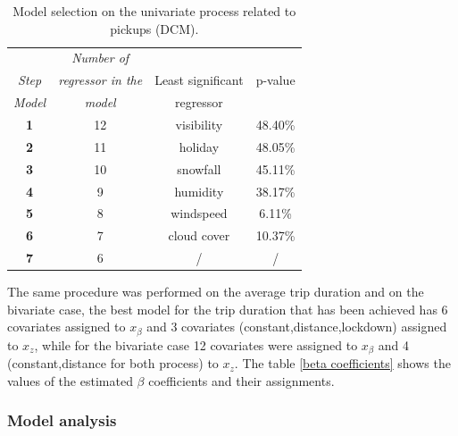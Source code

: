 \begin{table}[h!]
	\centering
	\renewcommand\arraystretch{1.3}
	\begin{tabular}{c|c|c|c}
		\hline
		\textit{} & \textit{Number of}  &  &    \\
		\textit{Step} & \textit{regressor in the}  & Least significant & p-value \\
		\textit{Model} & \textit{model}  & regressor &  \\
		\hline
		\textbf{1} & \num{12} & visibility & \num{48.40}\%  \\
		\hline
		\textbf{2} & \num{11} & holiday & \num{48.05}\%  \\
		\hline
		\textbf{3} & \num{10} & snowfall & \num{45.11}\%  \\
		\hline
		\textbf{4} & \num{9} & humidity & \num{38.17}\%  \\
		\hline
		\textbf{5} & \num{8} & windspeed & \num{6.11}\% \\
		\hline
		\textbf{6} & \num{7} & cloud cover & \num{10.37}\%  \\
		\hline
		\textbf{7} & \num{6} & /  &  / \\
		\hline
	\end{tabular}
	\caption[Model selection on the univariate process related to pickups (DCM).]{Model selection on the univariate process related to pickups (DCM).}
	\label{Model_selection_pickups}
\end{table}
\noindent


The same procedure was performed on the average trip duration and on the bivariate case, the best model for the trip duration that has been achieved has \num{6} covariates assigned to $x_{\beta}$ and \num{3} covariates (constant,distance,lockdown) assigned to $x_{z}$,
while for the bivariate case \num{12} covariates were assigned to $x_{\beta}$  and \num{4} (constant,distance for both process) to $x_{z}$. 
The table \ref{beta coefficients} shows the values of the estimated $\beta$ coefficients and their assignments.






\subsubsection{Model analysis}

